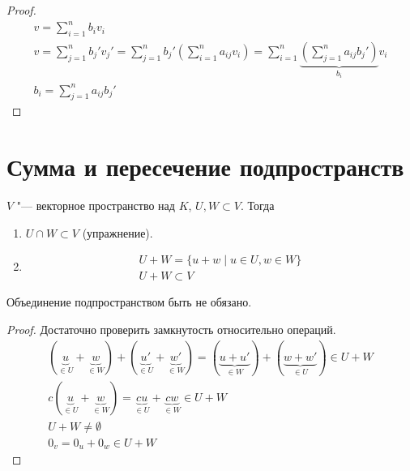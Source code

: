\begin{proof}
	\begin{gather*}
		v = \sum_{i = 1}^{n}b_i v_i \\
		v = \sum_{j = 1}^{n}b_{j}'v_{j}' = \sum_{j = 1}^{n}b_j'\left(\sum_{i = 1}^{n}a_{ij}v_i\right)
			=\sum_{i = 1}^{n}\underbrace{\left(\sum_{j = 1}^{n}a_{ij}b_j'\right)}_{b_i}v_i \\
		b_i = \sum_{j = 1}^{n}a_{ij}b_{j}'
	\end{gather*}
\end{proof}

\section{Сумма и пересечение подпространств}

\begin{theorem}
	$V$ "--- векторное пространство над $K$,
	$U, W \subset V$.
	Тогда
	\begin{enumerate}
	\item
		$U \cap W \subset V$ (упражнение).

	\item
		\begin{gather*}
			U + W = \{u + w \mid u \in U, w \in W\} \\
			U + W \subset V
		\end{gather*}
	\end{enumerate}
	Объединение подпространством быть не обязано.
\end{theorem}

\begin{proof}
	Достаточно проверить замкнутость относительно операций.
	\begin{gather*}
		(\underbrace{u}_{\in U} + \underbrace{w}_{\in W}) + (\underbrace{u'}_{\in U} + \underbrace{w'}_{\in W})
			= (\underbrace{u+u'}_{\in W}) + (\underbrace{w+w'}_{\in U}) \in U + W \\
		c(\underbrace{u}_{\in U} + \underbrace{w}_{\in W}) = \underbrace{cu}_{\in U} + \underbrace{cw}_{\in W} \in U + W \\
		U + W \ne \emptyset \\
		0_v = 0_{u} + 0_{w} \in U + W
	\end{gather*}
\end{proof}

